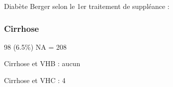 \documentclass[11pt,a4paper]{article}\usepackage[]{graphicx}\usepackage[]{color}
\begin{document}
% 
% 
% 
% 
% 

Diabète Berger selon le 1er traitement de suppléance :



\subsubsection*{Cirrhose}

98 (6.5\%) NA = 208

Cirrhose et VHB : aucun

Cirrhose et VHC : 4
\end{document}
